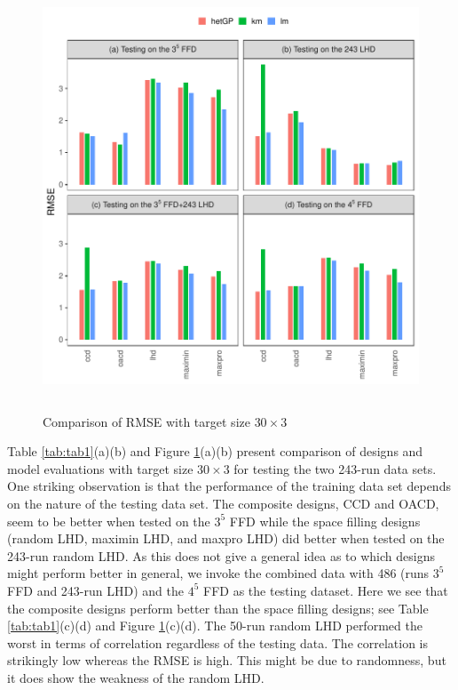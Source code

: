 \documentclass [PhD] {package/uclathes}
\begin{document}
\begin{figure}%
\centering
\includegraphics[height=5in, width=6in]{chapters/DE/pdfs/barplots1}
\caption{Comparison of RMSE with target size $30\times3$}
\label{barplots1}
\end{figure}


{Table \ref{tab:tab1}(a)(b) and Figure \ref{barplots1}(a)(b) present comparison of designs and model evaluations with target size $30\times 3$ for testing the two 243-run data sets.
One striking observation is that the performance of the training data set depends on the nature of the testing data set. The  composite designs, CCD and OACD, seem to be better when tested on the $3^5$ FFD while the space filling designs (random LHD, maximin LHD, and maxpro LHD) did better when tested on the 243-run random LHD.
As this does not give a general idea as to which designs might perform better in general, we invoke the combined data with 486 (runs $3^5$ FFD and 243-run LHD) and the $4^5$ FFD as the testing dataset.
Here we see that the composite designs perform better than the space filling designs; see Table \ref{tab:tab1}(c)(d) and Figure \ref{barplots1}(c)(d). The 50-run random LHD performed the worst in terms of correlation regardless of the testing data. The correlation is strikingly low whereas the RMSE is high. This might be due to randomness, but it does show the weakness of the random LHD.} %
\end{document}
